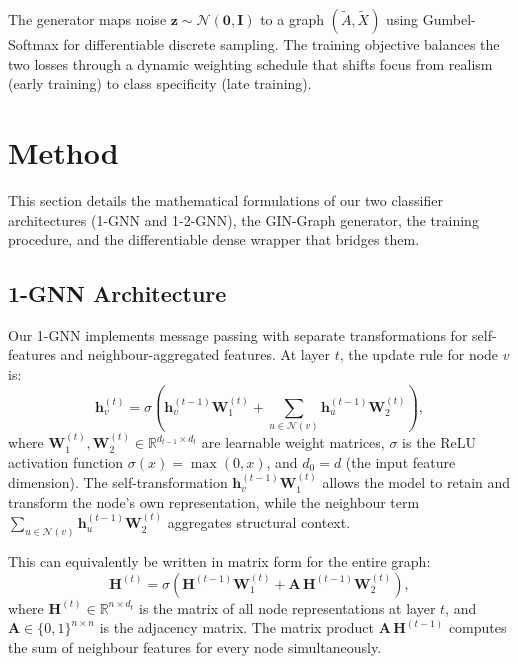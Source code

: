 \documentclass[12pt,a4paper]{article}
\begin{document}
The generator maps noise $\mathbf{z} \sim \mathcal{N}(\mathbf{0}, \mathbf{I})$ to a graph $(\tilde{A}, \tilde{X})$ using Gumbel-Softmax for differentiable discrete sampling. The training objective balances the two losses through a dynamic weighting schedule that shifts focus from realism (early training) to class specificity (late training).

\section{Method}
\label{sec:method}

This section details the mathematical formulations of our two classifier architectures (1-GNN and 1-2-GNN), the GIN-Graph generator, the training procedure, and the differentiable dense wrapper that bridges them.

\subsection{1-GNN Architecture}

Our 1-GNN implements message passing with separate transformations for self-features and neighbour-aggregated features. At layer $t$, the update rule for node $v$ is:
\begin{equation}
  \mathbf{h}_v^{(t)} = \sigma\!\left(\mathbf{h}_v^{(t-1)} \mathbf{W}_1^{(t)} + \sum_{u \in \mathcal{N}(v)} \mathbf{h}_u^{(t-1)} \mathbf{W}_2^{(t)}\right),
  \label{eq:1gnn}
\end{equation}
where $\mathbf{W}_1^{(t)}, \mathbf{W}_2^{(t)} \in \mathbb{R}^{d_{t-1} \times d_t}$ are learnable weight matrices, $\sigma$ is the ReLU activation function $\sigma(x) = \max(0, x)$, and $d_0 = d$ (the input feature dimension). The self-transformation $\mathbf{h}_v^{(t-1)} \mathbf{W}_1^{(t)}$ allows the model to retain and transform the node's own representation, while the neighbour term $\sum_{u \in \mathcal{N}(v)} \mathbf{h}_u^{(t-1)} \mathbf{W}_2^{(t)}$ aggregates structural context.

This can equivalently be written in matrix form for the entire graph:
\begin{equation}
  \mathbf{H}^{(t)} = \sigma\!\left(\mathbf{H}^{(t-1)} \mathbf{W}_1^{(t)} + \mathbf{A}\,\mathbf{H}^{(t-1)} \mathbf{W}_2^{(t)}\right),
  \label{eq:1gnn-matrix}
\end{equation}
where $\mathbf{H}^{(t)} \in \mathbb{R}^{n \times d_t}$ is the matrix of all node representations at layer $t$, and $\mathbf{A} \in \{0,1\}^{n \times n}$ is the adjacency matrix. The matrix product $\mathbf{A}\,\mathbf{H}^{(t-1)}$ computes the sum of neighbour features for every node simultaneously.
\end{document}
